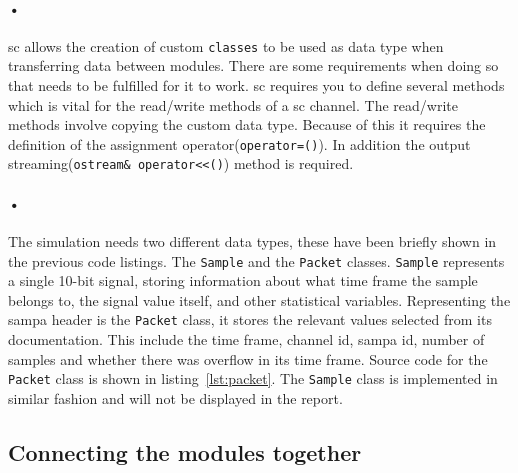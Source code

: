 \documentclass[a4paper, 12pt]{report}
\newcommand{\codeword}[1]{\texttt{#1}}
\begin{document}
\paragraph{•}
\gls{sc} allows the creation of custom \codeword{classes} to be used as data type when transferring data between modules.
There are some requirements when doing so that needs to be fulfilled for it to work.
\gls{sc} requires you to define several methods which is vital for the read/write methods of a \gls{sc} channel.
The read/write methods involve copying the custom data type.
Because of this it requires the definition of the assignment operator(\codeword{operator=()}).
In addition the output streaming(\codeword{ostream\& operator<<()}) method is required. 

\paragraph{•}
The simulation needs two different data types, these have been briefly shown in the previous code listings.
The \codeword{Sample} and the \codeword{Packet} classes.
\codeword{Sample} represents a single 10-bit signal, storing information about what time frame the sample belongs to, the signal value itself, and other statistical variables.
Representing the \gls{sampa} header is the \codeword{Packet} class, it stores the relevant values selected from its documentation.
This include the time frame, channel id, sampa id, number of samples and whether there was overflow in its time frame.
Source code for the \codeword{Packet} class is shown in listing~\ref{lst:packet}.
The \codeword{Sample} class is implemented in similar fashion and will not be displayed in the report. 

\begin{minipage}{\linewidth}

\end{minipage}

\subsection{Connecting the modules together}
\end{document}
